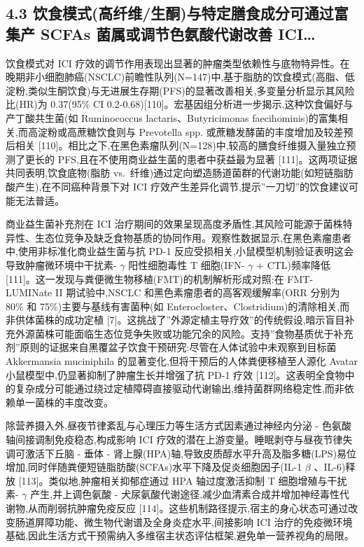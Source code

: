 \subsection{4.3 饮食模式(高纤维/生酮)与特定膳食成分可通过富集产 SCFAs 菌属或调节色氨酸代谢改善 ICI\ldots{}}\label{ux996eux98dfux6a21ux5f0fux9ad8ux7ea4ux7ef4ux751fux916eux4e0eux7279ux5b9aux81b3ux98dfux6210ux5206ux53efux901aux8fc7ux5bccux96c6ux4ea7-scfas-ux83ccux5c5eux6216ux8c03ux8282ux8272ux6c28ux9178ux4ee3ux8c22ux6539ux5584-ici}

饮食模式对 ICI 疗效的调节作用表现出显著的肿瘤类型依赖性与底物特异性。在晚期非小细胞肺癌(NSCLC)前瞻性队列(N=147)中,基于脂肪的饮食模式(高脂、低淀粉,类似生酮饮食)与无进展生存期(PFS)的显著改善相关,多变量分析显示其风险比(HR)为 0.37(95\% CI 0.2-0.68){[}110{]}。宏基因组分析进一步揭示,这种饮食偏好与产丁酸共生菌(如 Ruminococcus lactaris、Butyricimonas faecihominis)的富集相关,而高淀粉或高蔗糖饮食则与 Prevotella spp. 或蔗糖发酵菌的丰度增加及较差预后相关 {[}110{]}。相比之下,在黑色素瘤队列(N=128)中,较高的膳食纤维摄入量独立预测了更长的 PFS,且在不使用商业益生菌的患者中获益最为显著 {[}111{]}。这两项证据共同表明,饮食底物(脂肪 vs.~纤维)通过定向塑造肠道菌群的代谢功能(如短链脂肪酸产生),在不同癌种背景下对 ICI 疗效产生差异化调节,提示''一刀切''的饮食建议可能无法普适。

商业益生菌补充剂在 ICI 治疗期间的效果呈现高度矛盾性,其风险可能源于菌株特异性、生态位竞争及缺乏食物基质的协同作用。观察性数据显示,在黑色素瘤患者中,使用非标准化商业益生菌与抗 PD-1 反应受损相关,小鼠模型机制验证表明这会导致肿瘤微环境中干扰素- \(\gamma\) 阳性细胞毒性 T 细胞(IFN- \(\gamma\) + CTL)频率降低 {[}111{]}。这一发现与粪便微生物移植(FMT)的机制解析形成对照:在 FMT-LUMINate II 期试验中,NSCLC 和黑色素瘤患者的高客观缓解率(ORR 分别为 80\% 和 75\%)主要与基线有害菌种(如 Enterocloster、Clostridium)的清除相关,而非供体菌株的成功定植 {[}7{]}。这挑战了''外源定植主导疗效''的传统假设,暗示盲目补充外源菌株可能面临生态位竞争失败或功能冗余的风险。支持''食物基质优于补充剂''原则的证据来自黑覆盆子饮食干预研究:尽管在人体试验中未观察到目标菌 Akkermansia muciniphila 的显著变化,但将干预后的人体粪便移植至人源化 Avatar 小鼠模型中,仍显著抑制了肿瘤生长并增强了抗 PD-1 疗效 {[}112{]}。这表明全食物中的复杂成分可能通过绕过定植障碍直接驱动代谢输出,维持菌群网络稳定性,而非依赖单一菌株的丰度改变。

除营养摄入外,昼夜节律紊乱与心理压力等生活方式因素通过神经内分泌 - 色氨酸轴间接调制免疫稳态,构成影响 ICI 疗效的潜在上游变量。睡眠剥夺与昼夜节律失调可激活下丘脑 - 垂体 - 肾上腺(HPA)轴,导致皮质醇水平升高及脂多糖(LPS)易位增加,同时伴随粪便短链脂肪酸(SCFAs)水平下降及促炎细胞因子(IL-1 \(\beta\) 、IL-6)释放 {[}113{]}。类似地,肿瘤相关抑郁症通过 HPA 轴过度激活抑制 T 细胞增殖与干扰素- \(\gamma\) 产生,并上调色氨酸 - 犬尿氨酸代谢途径,减少血清素合成并增加神经毒性代谢物,从而削弱抗肿瘤免疫反应 {[}114{]}。这些机制路径提示,宿主的身心状态可通过改变肠道屏障功能、微生物代谢谱及全身炎症水平,间接影响 ICI 治疗的免疫微环境基础,因此生活方式干预需纳入多维宿主状态评估框架,避免单一营养视角的局限。

